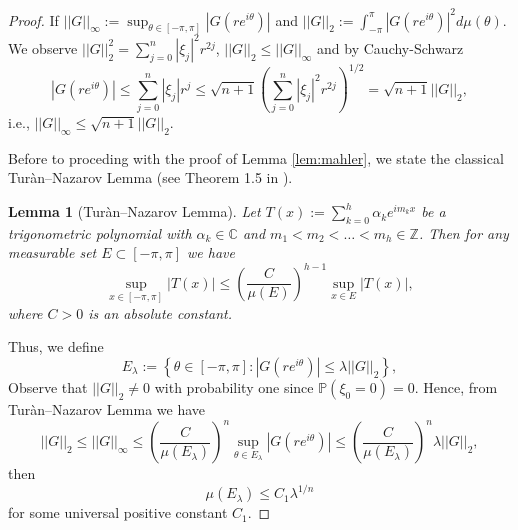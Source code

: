 \documentclass[12pt]{amsart}
\theoremstyle{plain}
\numberwithin{equation}{section}
\newtheorem{lemma}[theorem]{Lemma}
\renewcommand{\Pr}{\mathbb{P}}
\newcommand{\<}{\langle}
\renewcommand{\>}{\rangle}
\newcommand{\PP}[1]{\left(#1\right)}
\newcommand{\LL}[1]{\left\{#1\right\}}
\newcommand{\abs}[1]{\left|#1\right|}
\newcommand{\norm}[1]{\left|\left|#1\right|\right|}
\renewcommand{\Pr}[1]{\mathds{P}\left(#1\right)}
\begin{document}
\begin{proof}
If $\norm{ G }_{\infty} := \sup_{\theta\in[-\pi,\pi]} \abs{G(re^{i\theta})}$ and $\norm{ G }_{2} :=\int_{-\pi}^{\pi} \abs{G(re^{i\theta})}^2 d\mu(\theta)$. We observe $\norm{G}_2^2 = \sum_{j=0}^{n} \abs{\xi_j}^2 r^{2j}$, $\norm{ G }_{2} \leq \norm{ G }_{\infty}$ and by Cauchy-Schwarz
\[
\abs{G(re^{i\theta})} \leq \sum_{j=0}^n \abs{\xi_j} r^{j} \leq \sqrt{n+1}\PP{\sum_{j=0}^n  \abs{\xi_j}^2 r^{2j} }^{1/2} = \sqrt{n+1} \norm{G}_2,
\]
i.e., $\norm{ G }_{\infty} \leq \sqrt{n+1} \norm{G}_2$.

Before to proceding with the proof of Lemma \ref{lem:mahler}, we state the classical Tur\`an--Nazarov Lemma (see Theorem 1.5 in \cite{nazarov1994local}).

\begin{lemma}[Tur\`an--Nazarov Lemma]\label{lem:turan.nazarov} Let $T(x) := \sum_{k=0}^h \alpha_k e^{i m_k x}$ be a trigonometric polynomial with $\alpha_k\in \mathbb{C}$ and $m_1 < m_2 < \ldots < m_h \in \mathbb{Z}$. Then for any measurable set $E\subset [-\pi,\pi]$ we have 
\[
\sup_{x\in[-\pi,\pi]} |T(x)| \leq \left( \frac{C}{\mu(E)} \right)^{h-1} \sup_{x\in E} |T(x)|,
\]
where $C>0$ is an absolute constant.
\end{lemma}

Thus, we define 
\[
E_{\lambda}:= \LL{ \theta\in[-\pi,\pi] : \abs{G(re^{i\theta})} \leq \lambda \norm{G}_2 },
\]
Observe that $\norm{G}_2 \neq 0$ with probability one since $\Pr{\xi_0=0}=0$. Hence, from Tur\`an--Nazarov Lemma we have 
\[
\norm{G}_2 \leq \norm{ G }_{\infty}  \leq \PP{ \frac{C}{{\mu(E_{\lambda})}}}^{n} \sup_{\theta\in E_{\lambda}} \abs{G(re^{i\theta})} \leq \PP{ \frac{C}{{\mu(E_{\lambda})}}}^{n} \lambda \norm{G}_2,
\]
then
\begin{equation}\label{eqn:small01}
\mu(E_{\lambda}) \leq C_1 \lambda^{1/n}
\end{equation}
for some universal positive constant $C_1$. 


\end{proof}
\end{document}
